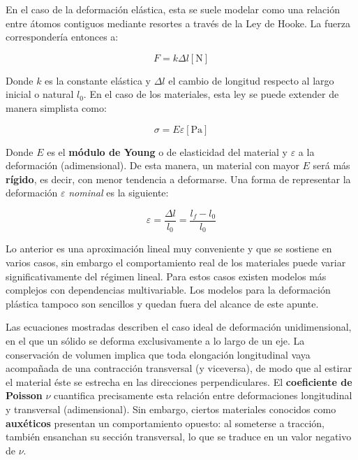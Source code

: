 En el caso de la deformación elástica, esta se suele modelar como una relación entre átomos contiguos mediante resortes a través de la Ley de Hooke. La fuerza correspondería entonces a:

\begin{equation}
    F=k\Delta l \mathrm{[N]}
\end{equation}

Donde $k$ es la constante elástica y $\Delta l$ el cambio de longitud respecto al largo inicial o natural $l_{0}$. En el caso de los materiales, esta ley se puede extender de manera simplista como:

\begin{equation}
    \sigma=E\varepsilon \mathrm{[Pa]}
\end{equation}

Donde $E$ es el \textbf{módulo de Young} o de elasticidad del material y $\varepsilon$ a la deformación (adimensional). De esta manera, un material con mayor $E$ será más \textbf{rígido}, es decir, con menor tendencia a deformarse. Una forma de representar la deformación $\varepsilon$ \textit{nominal} es la siguiente:

\begin{equation}
    \varepsilon = \frac{\Delta l}{l_{0}}=\frac{l_{f}-l_{0}}{l_{0}}
\end{equation}

Lo anterior es una aproximación lineal muy conveniente y que se sostiene en varios casos, sin embargo el comportamiento real de los materiales puede variar significativamente del régimen lineal. Para estos casos existen modelos más complejos con dependencias multivariable. Los modelos para la deformación plástica tampoco son sencillos y quedan fuera del alcance de este apunte.

Las ecuaciones mostradas describen el caso ideal de deformación unidimensional, en el que un sólido se deforma exclusivamente a lo largo de un eje. La conservación de volumen implica que toda elongación longitudinal vaya acompañada de una contracción transversal (y viceversa), de modo que al estirar el material éste se estrecha en las direcciones perpendiculares. El \textbf{coeficiente de Poisson} $\nu$ cuantifica precisamente esta relación entre deformaciones longitudinal y transversal (adimensional). Sin embargo, ciertos materiales conocidos como \textbf{auxéticos} presentan un comportamiento opuesto: al someterse a tracción, también ensanchan su sección transversal, lo que se traduce en un valor negativo de $\nu$.

